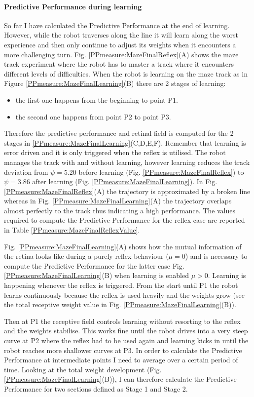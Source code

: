 \paragraph{Predictive Performance during learning} 
So far I have calculated the
Predictive Performance at the end of learning. However, while the robot traverses
along the line it will learn along the worst experience and then only continue to
adjust its weights when it encounters a more challenging turn. 
Fig. \ref{PPmeasure:MazeFinalReflex}(A)
shows the maze track experiment where the robot has to master a track 
where it encounters different levels of difficulties.
When the robot is learning on the maze track as in Figure \ref{PPmeasure:MazeFinalLearning}(B)
there are 2 stages of learning:
\begin{itemize}
\item the first one happens from the beginning to point P1.
\item the second one happens from point P2 to point P3.
\end{itemize}

Therefore the predictive performance and retinal field is computed for the 
2 stages in \ref{PPmeasure:MazeFinalLearning}(C,D,E,F).
Remember that learning is error driven and it is only triggered when the reﬂex is utilised.
The robot manages the track with and without learning, however learning reduces the track deviation from
$\psi = 5.20$ before learning (Fig. \ref{PPmeasure:MazeFinalReflex}) to 
$\psi = 3.86$ after learning (Fig. \ref{PPmeasure:MazeFinalLearning}).
In Fig. \ref{PPmeasure:MazeFinalReflex}(A) the trajectory is approximated by a
broken line whereas in Fig. \ref{PPmeasure:MazeFinalLearning}(A) 
the trajectory overlaps almost perfectly to the track thus indicating a high performance.
The values required to compute the Predictive Performance for the reflex case
are reported in Table \ref{PPmeasure:MazeFinalReflexValue}.

Fig. \ref{PPmeasure:MazeFinalLearning}(A) shows how the mutual information of the
retina looks like during a purely reflex behaviour ($\mu=0$) and is necessary to compute
the Predictive Performance for the latter case Fig. \ref{PPmeasure:MazeFinalLearning}(B)
when learning is enabled $\mu>0$. 
Learning is happening whenever the reﬂex is triggered. From the start until P1 
the robot learns continuously because the reﬂex is used heavily and the weights grow (see the total receptive
weight value in Fig. \ref{PPmeasure:MazeFinalLearning}(B)).

Then at P1 the receptive field controls learning without
resorting to the reﬂex and the weights stabilise. This works fine until the robot
drives into a very steep curve at P2 where the reﬂex had to be used again and
learning kicks in until the robot reaches more shallower curves at P3.
In order to calculate the Predictive Performance at intermediate points I
need to average over a certain period of time.
Looking at the total weight development (Fig. \ref{PPmeasure:MazeFinalLearning}(B)),
I can therefore calculate the Predictive Performance for two sections defined 
as Stage 1 and Stage 2. 

